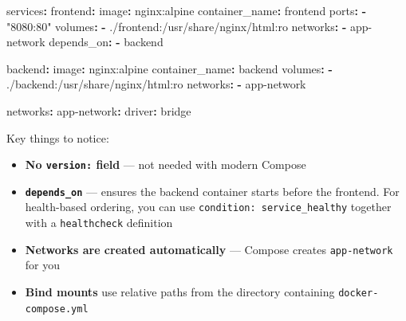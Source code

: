 \documentclass[11pt,american,a4paper,openany]{book}
\providecommand{\tightlist}{%
  \setlength{\itemsep}{2pt}\setlength{\parskip}{0pt}}
\newenvironment{Shaded}{}{}
\newcommand{\AttributeTok}[1]{\textcolor[rgb]{0.49,0.56,0.16}{#1}}
\newcommand{\FunctionTok}[1]{\textcolor[rgb]{0.02,0.16,0.49}{#1}}
\newcommand{\KeywordTok}[1]{\textcolor[rgb]{0.00,0.44,0.13}{\textbf{#1}}}
\newcommand{\StringTok}[1]{\textcolor[rgb]{0.25,0.44,0.63}{#1}}
\begin{document}
\begin{Shaded}
\begin{Highlighting}[]
\FunctionTok{services}\KeywordTok{:}
\AttributeTok{  }\FunctionTok{frontend}\KeywordTok{:}
\AttributeTok{    }\FunctionTok{image}\KeywordTok{:}\AttributeTok{ nginx:alpine}
\AttributeTok{    }\FunctionTok{container\_name}\KeywordTok{:}\AttributeTok{ frontend}
\AttributeTok{    }\FunctionTok{ports}\KeywordTok{:}
\AttributeTok{      }\KeywordTok{{-}}\AttributeTok{ }\StringTok{"8080:80"}
\AttributeTok{    }\FunctionTok{volumes}\KeywordTok{:}
\AttributeTok{      }\KeywordTok{{-}}\AttributeTok{ ./frontend:/usr/share/nginx/html:ro}
\AttributeTok{    }\FunctionTok{networks}\KeywordTok{:}
\AttributeTok{      }\KeywordTok{{-}}\AttributeTok{ app{-}network}
\AttributeTok{    }\FunctionTok{depends\_on}\KeywordTok{:}
\AttributeTok{      }\KeywordTok{{-}}\AttributeTok{ backend}

\AttributeTok{  }\FunctionTok{backend}\KeywordTok{:}
\AttributeTok{    }\FunctionTok{image}\KeywordTok{:}\AttributeTok{ nginx:alpine}
\AttributeTok{    }\FunctionTok{container\_name}\KeywordTok{:}\AttributeTok{ backend}
\AttributeTok{    }\FunctionTok{volumes}\KeywordTok{:}
\AttributeTok{      }\KeywordTok{{-}}\AttributeTok{ ./backend:/usr/share/nginx/html:ro}
\AttributeTok{    }\FunctionTok{networks}\KeywordTok{:}
\AttributeTok{      }\KeywordTok{{-}}\AttributeTok{ app{-}network}

\FunctionTok{networks}\KeywordTok{:}
\AttributeTok{  }\FunctionTok{app{-}network}\KeywordTok{:}
\AttributeTok{    }\FunctionTok{driver}\KeywordTok{:}\AttributeTok{ bridge}
\end{Highlighting}
\end{Shaded}

Key things to notice:

\begin{itemize}
\tightlist
\item
  \textbf{No \texttt{version:} field} --- not needed with modern Compose
\item
  \textbf{\texttt{depends\_on}} --- ensures the backend container starts
  before the frontend. For health-based ordering, you can use
  \texttt{condition:\ service\_healthy} together with a
  \texttt{healthcheck} definition
\item
  \textbf{Networks are created automatically} --- Compose creates
  \texttt{app-network} for you
\item
  \textbf{Bind mounts} use relative paths from the directory containing
  \texttt{docker-compose.yml}
\end{itemize}
\end{document}
